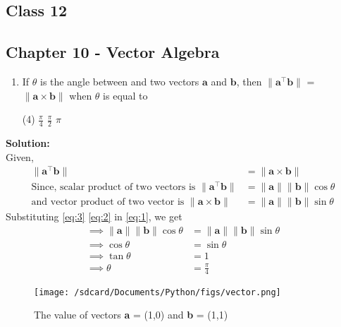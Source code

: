 \documentclass{article}
\newcommand{\norm}[1]{\lVert#1\rVert}
\renewcommand{\vec}[1]{\textbf{#1}}
\begin{document}
\onehalfspacing
\begin{center}
  \section*{\textbf{Class 12}}
  \subsection*{Chapter 10 - Vector Algebra}
\end{center}
\begin{enumerate}
  \item If $\theta$ is the angle between and two vectors $\vec{a}$ and $\vec{b}$, then $\norm{\vec{a}^{\top}\vec{b}}$ = $\norm{\vec{a}\times\vec{b}}$ when $\theta$ is equal to
    \begin{tasks}(4)
      \task $\frac{\pi}{4}$
      \task $\frac{\pi}{2}$
      \task $\pi$
      \end{tasks}
\end{enumerate}
  \textbf{Solution:}
  \\
Given,
\begin{align}
  \norm{\vec{a}^{\top}\vec{b}} &= \norm{\vec{a} \times \vec{b}} \label{eq:1}
  \\
  \text{Since, scalar product of two vectors is } \norm{\vec{a}^{\top}\vec{b}} &= \norm{\vec{a}}\norm{\vec{b}}\cos{\theta} \label{eq:2}
  \\
  \text{and vector product of two vector is }\norm{\vec{a} \times \vec{b}} &= \norm{\vec{a}}\norm{\vec{b}}\sin{\theta} \label{eq:3}
\end{align}
Substituting \eqref{eq:3} \eqref{eq:2} in \eqref{eq:1}, we get
\\
\begin{align}
  \implies \norm{\vec{a}}\norm{\vec{b}}\cos{\theta} &= \norm{\vec{a}}\norm{\vec{b}}\sin{\theta}\\
  \implies \cos{\theta} &= \sin{\theta}\\
  \implies \tan{\theta} &= 1\\
  \implies \theta &= \frac{\pi}{4}
\end{align}
\begin{figure}
  \begin{center}
    \texttt{[image: /sdcard/Documents/Python/figs/vector.png]}
  \end{center}
	\caption{The value of vectors \vec{a} = (1,0) and \vec{b} = (1,1)}
  \label{fig:12.10.5.19}
\end{figure}
\end{document}
